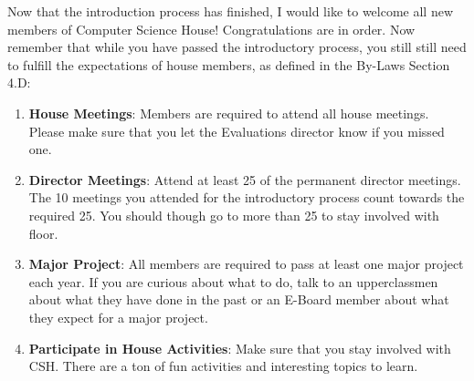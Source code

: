\documentclass[9pt]{extarticle} %
\begin{document}
\begin{minipage}[t]{.61\linewidth} %
\vspace{-0.4cm}
\hypertarget{firstnews}{}

Now that the introduction process has finished, I would like to welcome
all new members of Computer Science House! Congratulations are in
order. Now remember that while you have passed the introductory process,
you still still need to fulfill the expectations of house members, 
as defined in the By-Laws Section 4.D:

\begin{enumerate}
\item{\textbf{House Meetings}}: Members are required to attend all
house meetings. Please make sure that you let the Evaluations director
know if you missed one. \\

\item{\textbf{Director Meetings}}: Attend at least 25 of the permanent
director meetings. The 10 meetings you attended for the introductory 
process count towards the required 25. You should though go to more 
than 25 to stay involved with floor. \\

\item{\textbf{Major Project}}: All members are required to pass at least one
major project each year. If you are curious about what to do, talk to an
upperclassmen about what they have done in the past or an E-Board member
about what they expect for a major project. \\

\item{\textbf{Participate in House Activities}}: Make sure that you stay
involved with CSH. There are a ton of fun activities and interesting 
topics to learn.

\end{enumerate}


\hypertarget{secondnews}{} 

\begin{enumerate}


\end{enumerate}
\end{minipage}
\end{document}
